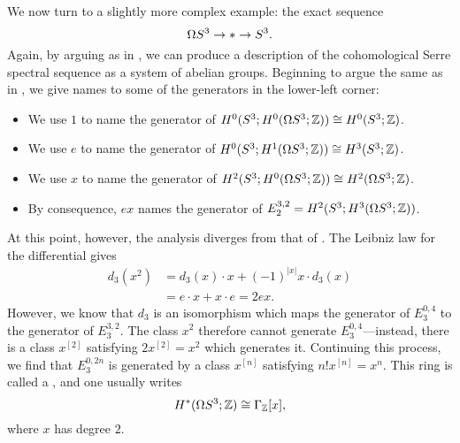 \begin{example}
We now turn to a slightly more complex example: the exact sequence \[\Omega S^3 \to * \to S^3.\]
Again, by arguing as in , we can produce a description of the cohomological Serre spectral sequence as a system of abelian groups.
Beginning to argue the same as in , we give names to some of the generators in the lower-left corner:
\begin{itemize}
    \item We use $1$ to name the generator of $H^0(S^3; H^0(\Omega S^3; \mathbb Z)) \cong H^0(S^3; \mathbb Z)$.
    \item We use $e$ to name the generator of $H^0(S^3; H^1(\Omega S^3; \mathbb Z)) \cong H^3(S^3; \mathbb Z)$.
    \item We use $x$ to name the generator of $H^2(S^3; H^0(\Omega S^3; \mathbb Z)) \cong H^2(\Omega S^3; \mathbb Z)$.
    \item By consequence, $ex$ names the generator of $E_2^{3, 2} = H^2(S^3; H^3(\Omega S^3; \mathbb Z))$.
\end{itemize}
At this point, however, the analysis diverges from that of .
The Leibniz law for the differential gives
\begin{align*}
d_3(x^2) & = d_3(x) \cdot x + (-1)^{|x|} x \cdot d_3(x) \\
& = e \cdot x + x \cdot e = 2ex.
\end{align*}
However, we know that $d_3$ is an isomorphism which maps the generator of $E_3^{0, 4}$ to the generator of $E_3^{3, 2}$.
The class $x^2$ therefore cannot generate $E_3^{0, 4}$---instead, there is a class $x^{[2]}$ satisfying $2x^{[2]} = x^2$ which generates it.
Continuing this process, we find that $E_3^{0, 2n}$ is generated by a class $x^{[n]}$ satisfying $n! x^{[n]} = x^n$.
This ring is called a , and one usually writes \[H^*(\Omega S^3; \mathbb Z) \cong \Gamma_{\mathbb Z}[x],\] where $x$ has degree $2$.
\end{example}

